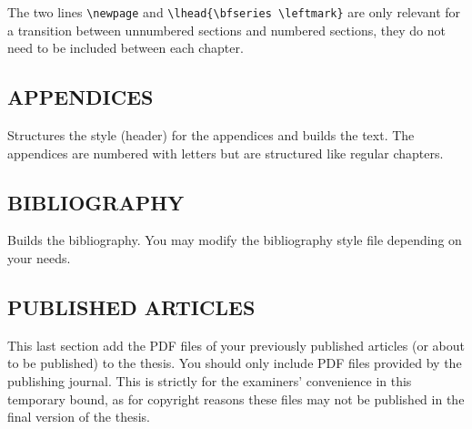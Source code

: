 The two lines \texttt{\textbackslash newpage} and \texttt{\textbackslash lhead\{\textbackslash bfseries \textbackslash leftmark\}} are only relevant for a transition between unnumbered sections and numbered sections, they do not need to be included between each chapter. 

\subsection{APPENDICES}

Structures the style (header) for the appendices and builds the text. The appendices are numbered with letters but are structured like regular chapters.

\subsection{BIBLIOGRAPHY}

Builds the bibliography. You may modify the bibliography style file depending on your needs.

\subsection{PUBLISHED ARTICLES}

This last section add the PDF files of your previously published articles (or about to be published) to the thesis. You should only include PDF files provided by the publishing journal. This is strictly for the examiners' convenience in this temporary bound, as for copyright reasons these files may not be published in the final version of the thesis.













